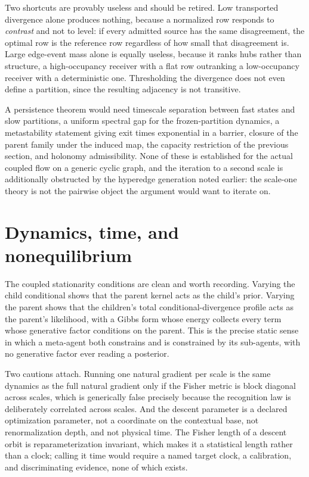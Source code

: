 \documentclass[11pt,letterpaper]{article}
\begin{document}
Two shortcuts are provably useless and should be retired. Low transported divergence
alone produces nothing, because a normalized row responds to \emph{contrast} and not
to level: if every admitted source has the same disagreement, the optimal row is the
reference row regardless of how small that disagreement is. Large edge-event mass
alone is equally useless, because it ranks hubs rather than structure, a
high-occupancy receiver with a flat row outranking a low-occupancy receiver with a
deterministic one. Thresholding the divergence does not even define a partition, since
the resulting adjacency is not transitive.

A persistence theorem would need timescale separation between fast states and slow
partitions, a uniform spectral gap for the frozen-partition dynamics, a metastability
statement giving exit times exponential in a barrier, closure of the parent family
under the induced map, the capacity restriction of the previous section, and holonomy
admissibility. None of these is established for the actual coupled flow on a generic
cyclic graph, and the iteration to a second scale is additionally obstructed by the
hyperedge generation noted earlier: the scale-one theory is not the pairwise object
the argument would want to iterate on.

\section{Dynamics, time, and nonequilibrium}

The coupled stationarity conditions are clean and worth recording. Varying the child
conditional shows that the parent kernel acts as the child's prior. Varying the parent
shows that the children's total conditional-divergence profile acts as the parent's
likelihood, with a Gibbs form whose energy collects every term whose generative factor
conditions on the parent. This is the precise static sense in which a meta-agent both
constrains and is constrained by its sub-agents, with no generative factor ever reading
a posterior.

Two cautions attach. Running one natural gradient per scale is the same dynamics as the
full natural gradient only if the Fisher metric is block diagonal across scales, which
is generically false precisely because the recognition law is deliberately correlated
across scales. And the descent parameter is a declared optimization parameter, not a
coordinate on the contextual base, not renormalization depth, and not physical time.
The Fisher length of a descent orbit is reparameterization invariant, which makes it a
statistical length rather than a clock; calling it time would require a named target
clock, a calibration, and discriminating evidence, none of which exists.
\end{document}
